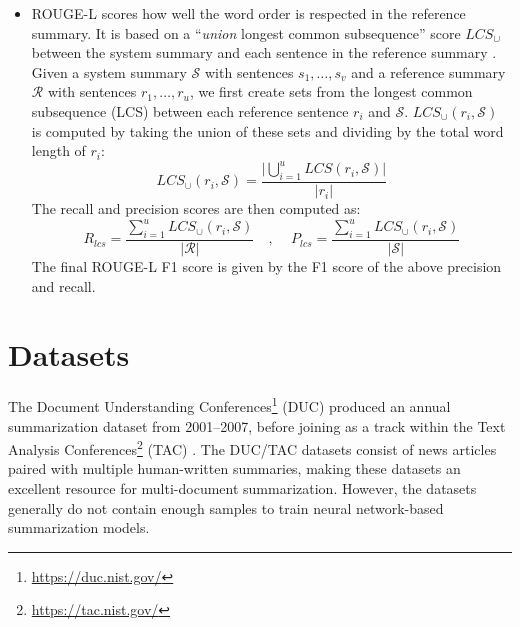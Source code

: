 \begin{itemize}
    Although the original paper describes this metric as a recall-based measure, recent models have at times reported the $\mathrm{F_1}$ score instead. This decision is usually based on the dataset and whether a summary length limit is specified. To better compare with state-of-the-art models, we compute the F1 score. In our experiments, we report both ROUGE-1 (unigram) and ROUGE-2 (bigram) metrics.
    \item ROUGE-L scores how well the word order is respected in the reference summary. It is based on a ``\textit{union} longest common subsequence'' score $LCS_{\cup}$ between the system summary and each sentence in the reference summary \parencite{eva1_lin:2004:ACLsummarization}. 
    Given a system summary $\mathcal{S}$ with sentences $s_1,\dots,s_v$ and a reference summary $\mathcal{R}$ with sentences $r_1,\dots,r_u$, we first create sets from the longest common subsequence (LCS) between each reference sentence $r_i$ and $\mathcal{S}$.
    $LCS_{\cup}(r_i, \mathcal{S})$ is computed by taking the union of these sets and dividing by the total word length of $r_i$:
    \begin{equation}
        LCS_{\cup}(r_i, \mathcal{S}) = \frac{\vert \bigcup_{i=1}^u LCS(r_i, \mathcal{S}) \vert}{\vert r_i \vert}
    \end{equation}
    The recall and precision scores are then computed as:
    \begin{equation}
        R_{lcs} = \frac{\sum_{i=1}^u LCS_{\cup}(r_i, \mathcal{S})}{\vert\mathcal{R}\vert} \quad\text{, }\quad
        P_{lcs} = \frac{\sum_{i=1}^u LCS_{\cup}(r_i, \mathcal{S})}{\vert\mathcal{S}\vert} 
    \end{equation}
    The final ROUGE-L F1 score is given by the F1 score of the above precision and recall.
\end{itemize}

\section{Datasets}
The Document Understanding Conferences\footnote{\url{https://duc.nist.gov/}} (DUC) produced an annual summarization dataset from 2001--2007, before joining as a track within the Text Analysis Conferences\footnote{\url{https://tac.nist.gov/}} (TAC) \parencite{harman-over-2004-effects, dang-2006-duc, dang2008overview}. The DUC/TAC datasets consist of news articles paired with multiple human-written summaries, making these datasets an excellent resource for multi-document summarization. However, the datasets generally do not contain enough samples to train neural network-based summarization models.

